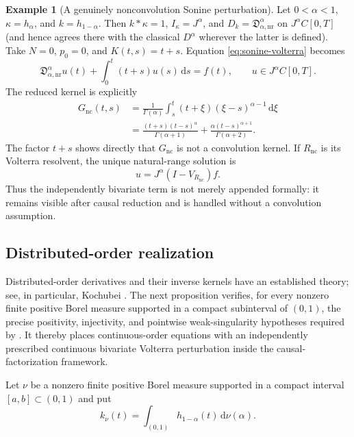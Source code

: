 \documentclass[11pt]{article}
\numberwithin{equation}{section}
\theoremstyle{definition}
\newtheorem{example}{Example}
\theoremstyle{remark}
\newcommand{\dd}{\,\mathrm d}
\begin{document}
\begin{example}[A genuinely nonconvolution Sonine perturbation]
Let $0<\alpha<1$, $\kappa=h_\alpha$, and $k=h_{1-\alpha}$. Then $k*\kappa=1$, $I_\kappa=J^\alpha$, and $D_k=\mathfrak D_{\alpha,\mathrm{nr}}^\alpha$ on $J^\alpha C[0,T]$ (and hence agrees there with the classical $D^\alpha$ wherever the latter is defined). Take $N=0$, $p_0=0$, and $K(t,s)=t+s$. Equation \eqref{eq:sonine-volterra} becomes
\begin{equation*}
\mathfrak D_{\alpha,\mathrm{nr}}^\alpha u(t)
+\int_0^t(t+s)u(s)\dd s=f(t),
\qquad u\in J^\alpha C[0,T].
\end{equation*}
The reduced kernel is explicitly
\begin{align*}
G_{\mathrm{nc}}(t,s)
&=\frac1{\Gamma(\alpha)}\int_s^t(t+\xi)(\xi-s)^{\alpha-1}\dd\xi\\
&=\frac{(t+s)(t-s)^\alpha}{\Gamma(\alpha+1)}
+\frac{\alpha(t-s)^{\alpha+1}}{\Gamma(\alpha+2)}.
\end{align*}
The factor $t+s$ shows directly that $G_{\mathrm{nc}}$ is not a convolution kernel. If $R_{\mathrm{nc}}$ is its Volterra resolvent, the unique natural-range solution is
\begin{equation*}
u=J^\alpha(I-V_{R_{\mathrm{nc}}})f.
\end{equation*}
Thus the independently bivariate term is not merely appended formally: it remains visible after causal reduction and is handled without a convolution assumption.
\end{example}

\subsection{Distributed-order realization}

Distributed-order derivatives and their inverse kernels have an established theory; see, in particular, Kochubei \cite{Kochubei2008}. The next proposition verifies, for every nonzero finite positive Borel measure supported in a compact subinterval of $(0,1)$, the precise positivity, injectivity, and pointwise weak-singularity hypotheses required by . It thereby places continuous-order equations with an independently prescribed continuous bivariate Volterra perturbation inside the causal-factorization framework.

Let $\nu$ be a nonzero finite positive Borel measure supported in a compact interval $[a,b]\subset(0,1)$ and put
\begin{equation}
k_\nu(t)=\int_{(0,1)}h_{1-\alpha}(t)\dd\nu(\alpha).
\label{eq:distributed-k}
\end{equation}
\end{document}
